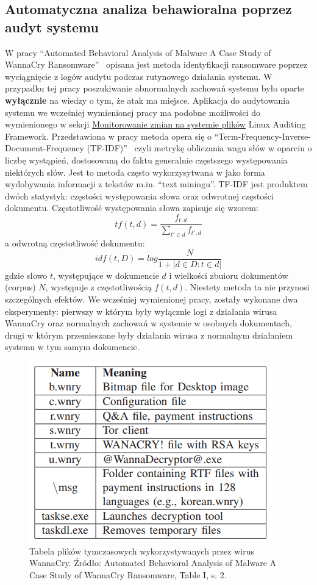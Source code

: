 \subsection{Automatyczna analiza behawioralna poprzez audyt systemu}
W pracy \foreignquote{english}{Automated Behavioral Analysis of Malware
A Case Study of WannaCry Ransomware}~\cite{8260673} opisana jest metoda identyfikacji ransomware
poprzez wyciągnięcie z logów audytu podczas rutynowego działania systemu. W przypadku tej pracy
poszukiwanie abnormalnych zachowań systemu było oparte \textbf{wyłącznie} na wiedzy o tym, że atak ma miejsce.
Aplikacja do audytowania systemu we wcześniej wymienionej pracy ma podobne możliwości do wymienionego w sekcji \hyperref[sec:monitorowanie]
{Monitorowanie zmian na systemie plików} Linux Auditing Framework.\newline
Przedstawiona w pracy metoda opera się o \foreignquote{english}{Term-Frequency-Inverse-Document-Frequency (TF-IDF)}~\cite{salton_term-weighting_1988} czyli metrykę obliczania 
wagu słów w oparciu o liczbę wystąpień, dostosowaną do faktu generalnie częstszego występowania niektórych słów.
Jest to metoda często wykorzysytwana w jako forma wydobywania informacji z tekstów m.in. \foreignquote{english}{text miningu}.
TF-IDF jest produktem dwóch statystyk: częstości występowania słowa oraz odwrotnej częstości dokumentu.
Częstotliwość występowania słowa zapisuje się wzorem:
$$
tf(t,d) = \frac{f_{t,d}}{\sum_{t'\in d}f_{t',d}}
$$
a odwrotną częstotliwość dokumentu:
$$
idf(t,D) = log \frac{N}{1 + |{d \in D : t \in d}|}
$$
gdzie słowo $t$, występujące w dokumencie $d$ i wielkości zbuioru dokumentów (corpus) $N$, występuje z częstotliwością $f(t,d)$.
\newline
Niestety metoda ta nie przynosi szczególnych efektów. We wcześniej wymienionej pracy, zostały wykonane dwa eksperymenty: 
pierwszy w którym były wyłącznie logi z działania wirusa WannaCry oraz normalnych zachowań w systemie w osobnych dokumentach, drugi
w którym przemieszane były działania wirusa z normalnym działaniem systemu w tym samym dokumencie.
\begin{figure}[H]
    \centering
    \includegraphics[width=0.3\linewidth]{rysunki/wannashit.png}
    \caption{Tabela plików tymczasowych wykorzystywanych przez wirus WannaCry. Źródło: 
    Automated Behavioral Analysis of Malware
A Case Study of WannaCry Ransomware, Table I, s. 2.}
    \label{fig:enter-label}
\end{figure}
